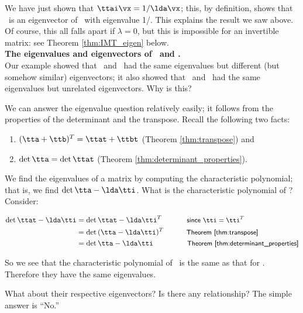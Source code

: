 We have just shown that $\ttai\vx = 1/\lda\vx$; this, by definition, shows that \vx\ is an eigenvector of \ttai\ with eigenvalue 1/\lda. This explains the result we saw above. Of course, this all falls apart if $\lambda = 0$, but this is impossible for an invertible matrix: see Theorem \ref{thm:IMT_eigen} below.\\

\noindent \textsf{\textbf{The eigenvalues and eigenvectors of \tta\ and \ttat.}}\\

Our example showed that \tta\ and \ttat\ had the same eigenvalues but different (but somehow similar) eigenvectors; it also showed that \ttb\ and \ttbt\ had the same eigenvalues but unrelated eigenvectors. Why is this?

We can answer the eigenvalue question relatively easily; it follows from the properties of the determinant and the transpose. Recall the following two facts:
	\begin{enumerate}
	\item		$(\tta +\ttb)^T = \ttat + \ttbt$ (Theorem \ref{thm:transpose}) and 
	\item		$\det{\tta} = \det{\ttat}$ (Theorem \ref{thm:determinant_properties}).
	\end{enumerate}
	
We find the eigenvalues of a matrix by computing the characteristic polynomial; that is, we find $\det{\tta - \lda\tti}$. What is the characteristic polynomial of \ttat? Consider:

\begin{align*}
\det{\ttat - \lda\tti} & = \det{\ttat - \lda\tti^T} \textsf{\hskip 34 pt \small since $\tti = \tti^T$} \\
 & = \det{(\tta - \lda\tti)^T}  \textsf{\hskip 31 pt\small Theorem \ref{thm:transpose}} \\
 & = \det{\tta-\lda\tti}   \textsf{\hskip 46 pt \small Theorem \ref{thm:determinant_properties}}\\
\end{align*} 

So we see that the characteristic polynomial of \ttat\ is the same as that for \tta. Therefore they have the same eigenvalues. 

What about their respective eigenvectors? Is there any relationship? The simple answer is ``No.''


